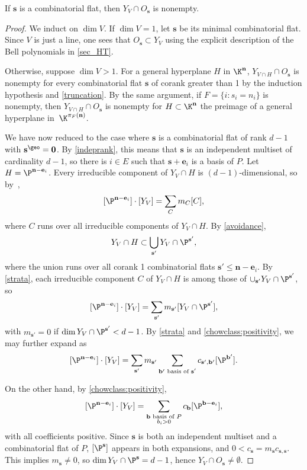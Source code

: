 \begin{lemm}\label{inclusion}
If $\mathbf s$ is a combinatorial flat, then $Y_V \cap O_{\mathbf s}$ is nonempty.  
\end{lemm}
\begin{proof}
  We induct on $\dim V$.
  If $\dim V = 1$, let $\mathbf s$ be its minimal combinatorial flat.
  Since $V$ is just a line, one sees that $O_{\mathbf s} \subset Y_V$ using the explicit description of the Bell polynomials in \cref{sec_HT}.

  Otherwise, suppose $\dim V > 1$.
  For a general hyperplane $H$ in $\K^{\mathbf n}$, $Y_{V \cap H} \cap O_{\mathbf s}$ is nonempty for every combinatorial flat $\mathbf s$ of corank greater than 1 by the induction hypothesis and \cref{truncation}.
  By the same argument, if $F = \{i : s_i = n_i\}$ is nonempty, then  $Y_{V \cap H} \cap O_{\mathbf s}$ is nonempty for $H \subset \K^{\mathbf n}$ the preimage of a general hyperplane in~$\K^{\pi_F(\mathbf n)}$.

  We have now reduced to the case where $\mathbf s$ is a combinatorial flat of rank $d-1$ with $\mathbf s^\geo = \mathbf 0$.
  By \cref{indeprank}, this means that $\mathbf s$ is an independent multiset of cardinality $d-1$, so there is $i \in E$ such that $\mathbf s + \mathbf e_i$ is a basis of $P$.
  Let $H = \P^{\mathbf n - \mathbf e_i}$.
  Every irreducible component of $Y_V \cap H$ is $(d-1)$-dimensional, so by~\cite[Theorem 1.26]{EH16},
  \[
    [\P^{\mathbf n - \mathbf e_i}] \cdot [Y_V] = \sum_C m_C [C],
  \]
  where $C$ runs over all irreducible components of $Y_V \cap H$.
  By \cref{avoidance}, 
  \[
  Y_V \cap H \subset \bigcup_{\mathbf s'} Y_V \cap \P^{\mathbf s'},
  \]
  where the union runs over all corank 1 combinatorial flats $\mathbf s' \leq \mathbf n - \mathbf e_i$.
  By \cref{strata}, each irreducible component $C$ of $Y_V \cap H$ is among those of $\cup_{\mathbf s'} Y_V \cap \P^{\mathbf s'}$, so
  \[
        [\P^{\mathbf n - \mathbf e_i}] \cdot [Y_V] = \sum_{\mathbf s'} m_{\mathbf s'} [Y_V \cap \P^{\mathbf s'}],
  \]
  with $m_{\mathbf s'} = 0$ if $\dim Y_V \cap \P^{\mathbf s'} < d-1$.
  By \cref{strata} and \cref{chowclass:positivity}, we may further expand as
  \[
        [\P^{\mathbf n - \mathbf e_i}] \cdot [Y_V] = \sum_{\mathbf s'} m_{\mathbf s'} \sum_{\mathbf b' \text{ basis of $\mathbf s'$}} c_{\mathbf s', \mathbf b'} [\P^{\mathbf b'}].
  \]
  
   On the other hand, by \cref{chowclass:positivity},
   \[
      [\P^{\mathbf n - \mathbf e_i}] \cdot [Y_V] = \sum_{\substack{\mathbf b \text{ basis of $P$}\\b_i > 0}} c_{\mathbf b} [\P^{\mathbf b - \mathbf e_i}],
   \]
   with all coefficients positive.
   Since $\mathbf s$ is both an independent multiset and a combinatorial flat of $P$,  $[\P^{\mathbf s}]$ appears in both expansions, and $0 < c_{\mathbf s} = m_{\mathbf s} c_{\mathbf s, \mathbf s}$.
   This implies $m_{\mathbf s} \neq 0$, so $\dim Y_V \cap \P^{\mathbf s} = d-1$, hence $Y_V \cap O_{\mathbf s} \neq \emptyset$.
\end{proof}
